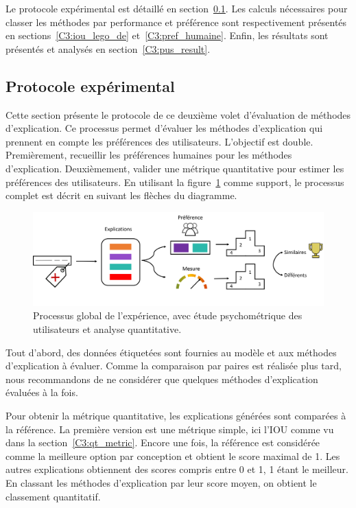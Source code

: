 Le protocole expérimental est détaillé en section~\ref{C3:protocole_expe}.
Les calculs nécessaires pour classer les méthodes par performance et préférence sont respectivement présentés en sections~\ref{C3:iou_lego_de} et~\ref{C3:pref_humaine}. Enfin, les résultats sont présentés et analysés en section~\ref{C3:pus_result}.

\subsection{Protocole expérimental} \label{C3:protocole_expe}

Cette section présente le protocole de ce deuxième volet d'évaluation de méthodes d'explication.
Ce processus permet d'évaluer les méthodes d'explication qui prennent en compte les préférences des utilisateurs. L'objectif est double. Premièrement, recueillir les préférences humaines pour les méthodes d'explication. Deuxièmement, valider une métrique quantitative pour estimer les préférences des utilisateurs.
En utilisant la figure~\ref{fig:experiment} comme support, le processus complet est  décrit en suivant les flèches du diagramme.

\begin{figure}[h!tpb]
  \setlength{\belowcaptionskip}{-20pt}
 \begin{center}
  \includegraphics[width=\textwidth]{S3-Comparaison_de_methodes/figures/experiment.png} %
  \caption{Processus global de l'expérience, avec étude psychométrique des utilisateurs et analyse quantitative.}\label{fig:experiment}
 \end{center}
\end{figure}

Tout d'abord, des données étiquetées sont fournies au modèle et aux méthodes d'explication à évaluer. Comme la comparaison par paires est réalisée plus tard, nous recommandons de ne considérer que quelques méthodes d'explication évaluées à la fois.

Pour obtenir la métrique quantitative, les explications générées sont comparées à la référence.
La première version est une métrique simple, ici l'IOU comme vu dans la section~\ref{C3:qt_metric}. Encore une fois, la référence est considérée comme la meilleure option par conception et obtient le score maximal de 1. Les autres explications obtiennent des scores compris entre 0 et 1, 1 étant le meilleur. En classant les méthodes d'explication par leur score moyen, on obtient le classement quantitatif.

